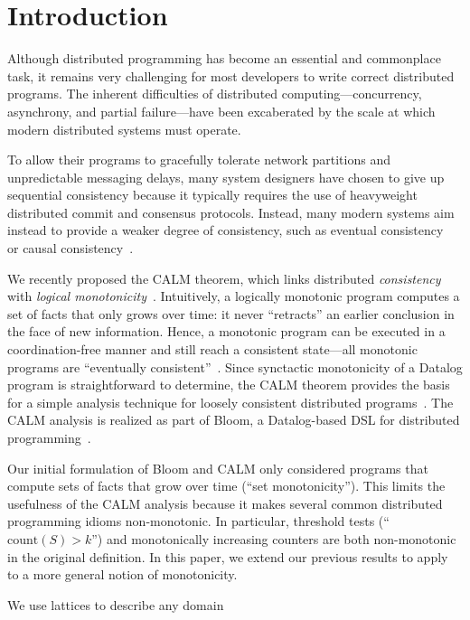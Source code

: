 \section{Introduction}
\label{sec:intro}
Although distributed programming has become an essential and commonplace task,
it remains very challenging for most developers to write correct distributed
programs. The inherent difficulties of distributed computing---concurrency,
asynchrony, and partial failure---have been excaberated by the scale at which
modern distributed systems must operate.

To allow their programs to gracefully tolerate network partitions and
unpredictable messaging delays, many system designers have chosen to give up
sequential consistency because it typically requires the use of heavyweight
distributed commit and consensus protocols. Instead, many modern systems aim
instead to provide a weaker degree of consistency, such as eventual
consistency~\cite{Terry1995} or causal consistency~\cite{Lloyd2011}.

We recently proposed the CALM theorem, which links distributed
\emph{consistency} with \emph{logical
  monotonicity}~\cite{Alvaro2011,Hellerstein2010}. Intuitively, a logically
monotonic program computes a set of facts that only grows over time: it never
``retracts'' an earlier conclusion in the face of new information. Hence, a
monotonic program can be executed in a coordination-free manner and still reach
a consistent state---all monotonic programs are ``eventually
consistent''~\cite{Ameloot2011}. Since synctactic monotonicity of a Datalog
program is straightforward to determine, the CALM theorem provides the basis for
a simple analysis technique for loosely consistent distributed
programs~\cite{Alvaro2011}. The CALM analysis is realized as part of Bloom, a
Datalog-based DSL for distributed programming~\cite{bloom}.

Our initial formulation of Bloom and CALM only considered programs that compute
sets of facts that grow over time (``set monotonicity''). This limits the
usefulness of the CALM analysis because it makes several common distributed
programming idioms non-monotonic. In particular, threshold tests
(``$\textrm{count}(S) > k$'') and monotonically increasing counters are both
non-monotonic in the original definition. In this paper, we extend our previous
results to apply to a more general notion of monotonicity.

 We use lattices to
describe any domain

